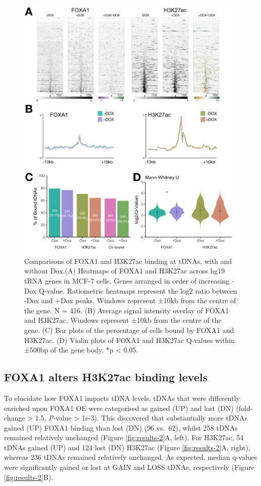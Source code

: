 \documentclass[
  12pt,
]{article}
\begin{document}
\begin{figure}[H]
\includegraphics[width=1\linewidth]{../images/results-01} \caption{Comparisons of FOXA1 and H3K27ac binding at tDNAs, with and without Dox.(A) Heatmaps of FOXA1 and H3K27ac across hg19 tRNA genes in MCF-7 cells. Genes arranged in order of increasing -Dox Q-value. Ratiometric heatmaps represent the log2 ratio between -Dox and +Dox peaks. Windows represent ±10kb from the centre of the gene. N = 416. (B) Average signal intensity overlay of FOXA1 and H3K27ac. Windows represent ±10kb from the centre of the gene. (C) Bar plots of the percentage of cells bound by FOXA1 and H3K27ac. (D) Violin plots of FOXA1 and H3K27ac Q-values within ±500bp of the gene body. *p < 0.05.}\label{fig:results-1}
\end{figure}

\hypertarget{foxa1-alters-h3k27ac-binding-levels}{%
\subsection{FOXA1 alters H3K27ac binding levels}\label{foxa1-alters-h3k27ac-binding-levels}}

To elucidate how FOXA1 impacts tDNA levels, tDNAs that were differently enriched upon FOXA1 OE were categorised as gained (UP) and lost (DN) (fold-change \textgreater{} 1.5, \emph{P}-value \textgreater{} 1e-3).
This discovered that substantially more tDNAs gained (UP) FOXA1 binding than lost (DN) (96 vs.~62), whilst 258 tDNAs remained relatively unchanged (Figure \ref{fig:results-2}A, left).
For H3K27ac, 54 tDNAs gained (UP) and 124 lost (DN) H3K27ac (Figure \ref{fig:results-2}A, right), whereas 236 tDNAs remained relatively unchanged.
As expected, median q-values were significantly gained or lost at GAIN and LOSS tDNAs, respectively (Figure \ref{fig:results-2}B).
\end{document}
